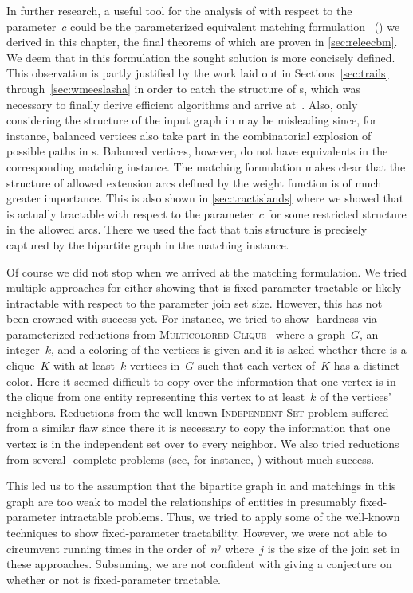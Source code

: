 In further research, a useful tool for the analysis of \pWMEEs{} with respect to the parameter~$c$ could be the parameterized equivalent matching formulation \pCBM{}~(\pCBMs{}) we derived in this chapter, the final theorems of which are proven in \autoref{sec:releecbm}. We deem that in this formulation the sought solution is more concisely defined. This observation is partly justified by the work laid out in Sections~\ref{sec:trails} through~\ref{sec:wmeeslasha} in order to catch the structure of \EE s, which was necessary to finally derive efficient algorithms and arrive at~\pCBMs{}. Also, only considering the structure of the input graph in \pWMEEs{} may be misleading since, for instance, balanced vertices also take part in the combinatorial explosion of possible paths in \EE s. Balanced vertices, however, do not have equivalents in the corresponding matching instance. The matching formulation makes clear that the structure of allowed extension arcs defined by the weight function is of much greater importance. This is also shown in \autoref{sec:tractislands} where we showed that \pWMEEs{} is actually tractable with respect to the parameter~$c$ for some restricted structure in the allowed arcs. There we used the fact that this structure is precisely captured by the bipartite graph in the matching instance.

Of course we did not stop when we arrived at the matching formulation. We tried multiple approaches for either showing that \pCBMs{} is fixed-parameter tractable or likely intractable with respect to the parameter join set size. However, this has not been crowned with success yet. For instance, we tried to show -hardness via parameterized reductions from \textsc{Multicolored Clique}~\cite{FHRV09} where a graph~$G$, an integer~$k$, and a coloring of the vertices is given and it is asked whether there is a clique~$K$ with at least~$k$ vertices in~$G$ such that each vertex of~$K$ has a distinct color. Here it seemed difficult to copy over the information that one vertex is in the clique from one entity representing this vertex to at least~$k$ of the vertices' neighbors. Reductions from the well-known \textsc{Independent Set} problem suffered from a similar flaw since there it is necessary to copy the information that one vertex is in the independent set over to every neighbor. We also tried reductions from several -complete problems (see, for instance, \citet{FG06}) without much success. 

This led us to the assumption that the bipartite graph in \pCBMs{} and matchings in this graph are too weak to model the relationships of entities in presumably fixed-parameter intractable problems. Thus, we tried to apply some of the well-known techniques to show fixed-parameter tractability. However, we were not able to circumvent running times in the order of~$n^j$ where~$j$ is the size of the join set in these approaches. Subsuming, we are not confident with giving a conjecture on whether or not \pCBMs{} is fixed-parameter tractable. 








